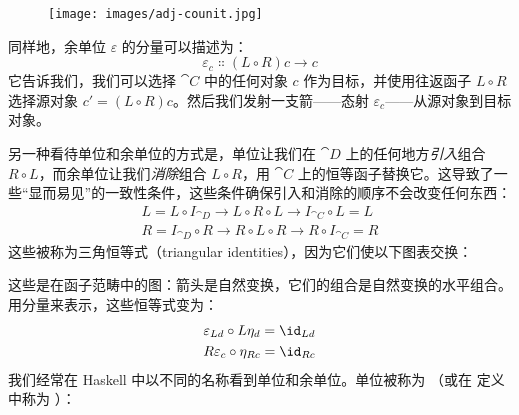 \begin{figure}[H]
  \centering
  \texttt{[image: images/adj-counit.jpg]}
\end{figure}

\noindent
同样地，余单位 $\varepsilon$ 的分量可以描述为：
\[\varepsilon_{c} \Colon (L \circ R) c \to c\]
它告诉我们，我们可以选择 $\cat{C}$ 中的任何对象 $c$ 作为目标，并使用往返函子 $L \circ R$ 选择源对象 $c' = (L \circ R) c$。然后我们发射一支箭——态射 $\varepsilon_{c}$——从源对象到目标对象。

另一种看待单位和余单位的方式是，单位让我们在 $\cat{D}$ 上的任何地方\emph{引入}组合 $R \circ L$，而余单位让我们\emph{消除}组合 $L \circ R$，用 $\cat{C}$ 上的恒等函子替换它。这导致了一些“显而易见”的一致性条件，这些条件确保引入和消除的顺序不会改变任何东西：
\begin{gather*}
  L = L \circ I_{\cat{D}} \to L \circ R \circ L \to I_{\cat{C}} \circ L = L \\
  R = I_{\cat{D}} \circ R \to R \circ L \circ R \to R \circ I_{\cat{C}} = R
\end{gather*}
这些被称为三角恒等式（triangular identities），因为它们使以下图表交换：

\begin{figure}[H]
  \centering

  \begin{subfigure}
    \centering
  \end{subfigure}%
  \hspace{1cm}
  \begin{subfigure}
    \centering
  \end{subfigure}
\end{figure}

\noindent
这些是在函子范畴中的图：箭头是自然变换，它们的组合是自然变换的水平组合。用分量来表示，这些恒等式变为：
\begin{gather*}
  \varepsilon_{L d} \circ L \eta_d = \id_{L d} \\
  R \varepsilon_{c} \circ \eta_{R c} = \id_{R c}
\end{gather*}
我们经常在 Haskell 中以不同的名称看到单位和余单位。单位被称为 （或在  定义中称为 ）：

